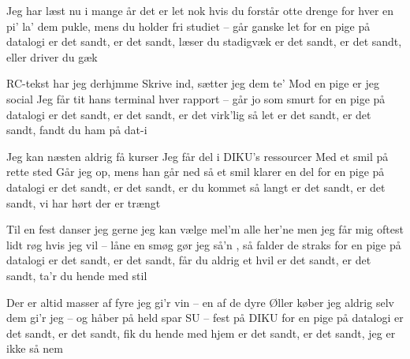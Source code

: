 \documentclass[a4paper,11pt]{article}
\begin{document}
\begin{song}
Jeg har læst nu i mange år
det er let nok hvis du forstår
otte drenge for hver en pi'
la' dem pukle, mens du holder fri
studiet -- går ganske let
for en pige på datalogi
%
er det sandt, er det sandt, læser du stadigvæk
er det sandt, er det sandt, eller driver du gæk

 RC-tekst har jeg derhjmme
 Skrive ind, sætter jeg dem te'
 Mod en pige er jeg social
%
Jeg får tit hans terminal
hver rapport -- går jo som smurt
 for en pige på datalogi
%
er det sandt, er det sandt, er det virk'lig så let
er det sandt, er det sandt, fandt du ham på dat-i

 Jeg kan næsten aldrig få kurser
 Jeg får del i DIKU's ressourcer
 Med et smil på rette sted
%
Går jeg op, mens han går ned
så et smil klarer en del
 for en pige på datalogi
%
er det sandt, er det sandt, er du kommet så langt
er det sandt, er det sandt, vi har hørt der er trængt

 Til en fest danser jeg gerne
 jeg kan vælge mel'm alle her'ne
 men jeg får mig oftest lidt røg
%
hvis jeg vil -- låne en smøg
gør jeg så'n , så falder de straks
 for en pige på datalogi
 er det sandt, er det sandt, får du aldrig et hvil
 er det sandt, er det sandt, ta'r du hende med stil

 Der er altid masser af fyre
 jeg gi'r vin -- en af de dyre
 Øller køber jeg aldrig selv
 dem gi'r jeg -- og håber på held
 spar SU -- fest på DIKU
 for en pige på datalogi
%
er det sandt, er det sandt, fik du hende med hjem
er det sandt, er det sandt,
 jeg er ikke så nem
\end{song}
\end{document}
